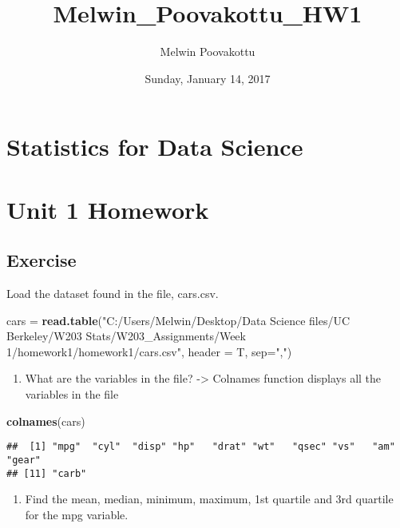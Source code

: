 \documentclass[]{article}
\title{Melwin\_Poovakottu\_HW1}
\author{Melwin Poovakottu}
\date{Sunday, January 14, 2017}
\newenvironment{Shaded}{\begin{snugshade}}{\end{snugshade}}
\newcommand{\KeywordTok}[1]{\textcolor[rgb]{0.13,0.29,0.53}{\textbf{{#1}}}}
\newcommand{\DataTypeTok}[1]{\textcolor[rgb]{0.13,0.29,0.53}{{#1}}}
\newcommand{\StringTok}[1]{\textcolor[rgb]{0.31,0.60,0.02}{{#1}}}
\newcommand{\NormalTok}[1]{{#1}}
\begin{document}
\maketitle


\section{Statistics for Data Science}\label{statistics-for-data-science}

\section{Unit 1 Homework}\label{unit-1-homework}

\subsection{Exercise}\label{exercise}

Load the dataset found in the file, cars.csv.

\begin{Shaded}
\begin{Highlighting}[]
\NormalTok{cars =}\StringTok{ }\KeywordTok{read.table}\NormalTok{(}\StringTok{"C:/Users/Melwin/Desktop/Data Science files/UC Berkeley/W203 Stats/W203_Assignments/Week 1/homework1/homework1/cars.csv"}\NormalTok{, }\DataTypeTok{header =} \NormalTok{T, }\DataTypeTok{sep=}\StringTok{","}\NormalTok{)}
\end{Highlighting}
\end{Shaded}

\begin{enumerate}
\def\labelenumi{\arabic{enumi}.}
\itemsep1pt\parskip0pt
\item
  What are the variables in the file? -\textgreater{} Colnames function
  displays all the variables in the file
\end{enumerate}

\begin{Shaded}
\begin{Highlighting}[]
\KeywordTok{colnames}\NormalTok{(cars)}
\end{Highlighting}
\end{Shaded}

\begin{verbatim}
##  [1] "mpg"  "cyl"  "disp" "hp"   "drat" "wt"   "qsec" "vs"   "am"   "gear"
## [11] "carb"
\end{verbatim}

\begin{enumerate}
\def\labelenumi{\arabic{enumi}.}
\setcounter{enumi}{1}
\itemsep1pt\parskip0pt
\item
  Find the mean, median, minimum, maximum, 1st quartile and 3rd quartile
  for the mpg variable.
\end{enumerate}
\end{document}
